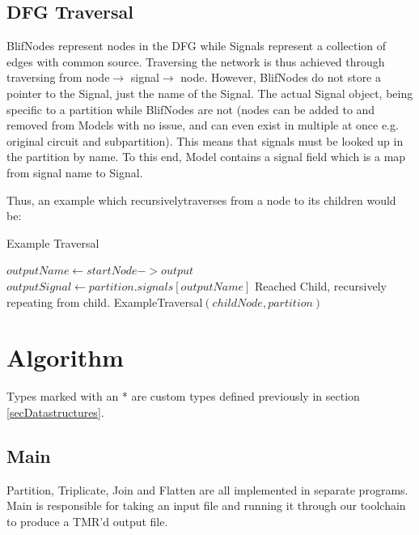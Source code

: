 \documentclass[12pt,final,oneside]{dwThesis} %
\begin{document}
   \subsection{\ac{DFG} Traversal}
   BlifNodes represent nodes in the \ac{DFG} while Signals represent a collection of edges with common source. Traversing the network is thus achieved through traversing from node$\rightarrow$ signal$\rightarrow$ node. However, BlifNodes do not store a pointer to the Signal, just the name of the Signal. The actual Signal object, being specific to a partition while BlifNodes are not (nodes can be added to and removed from Models with no issue, and can even exist in multiple at once e.g. original circuit and subpartition). This means that signals must be looked up in the partition by name. To this end, Model contains a signal field which is a map from signal name to Signal.

   Thus, an example which recursivelytraverses from a node to its children would be:
   \begin{algorithm}
      \caption{Example Traversal}\label{algExTrav}
      \begin{algorithmic}[1]
            \State $outputName \gets startNode->output$ 
            \State $outputSignal \gets partition.signals[outputName]$ 
             
               \State Reached Child, recursively repeating from child.
               \State ExampleTraversal$(childNode, partition)$ 
            \EndFor
         \EndProcedure
      \end{algorithmic}
   \end{algorithm}


   \newpage
   \section{Algorithm}\label{secAlgorithm}
   Types marked with an * are custom types defined previously in section \ref{secDatastructures}.
   \subsection{Main}
   Partition, Triplicate, Join and Flatten are all implemented in separate programs. Main is responsible for taking an input file and running it through our toolchain to produce a TMR'd output file.
\end{document}
